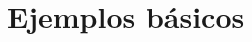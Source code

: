 \section{Ejemplos básicos}

\SimpleProbEchoService

\SimpleProbEchoClient

\SimpleIdleClient

\SimpleCoinFlipEchoClient

